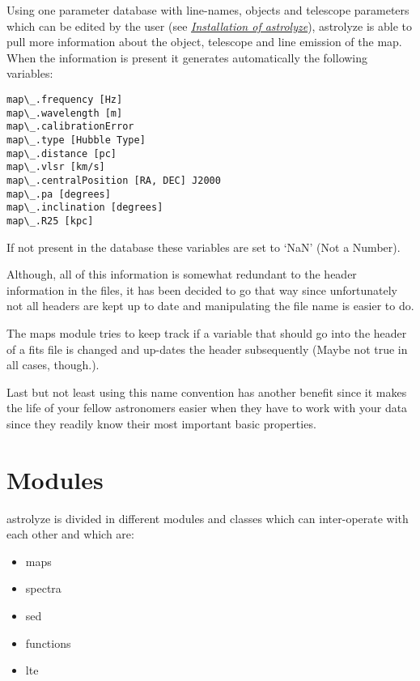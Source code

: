 \documentclass[letterpaper,10pt,english]{sphinxhowto}
\begin{document}
Using one parameter database with line-names, objects and telescope parameters
which can be edited by the user (see {\hyperref[installation::doc]{\emph{Installation of astrolyze}}}), astrolyze is able to
pull more information about the object, telescope and line emission of the
map. When the information is present it generates automatically the following
variables:

\begin{Verbatim}[commandchars=\\\{\}]
map\_.frequency [Hz]
map\_.wavelength [m]
map\_.calibrationError
map\_.type [Hubble Type]
map\_.distance [pc]
map\_.vlsr [km/s]
map\_.centralPosition [RA, DEC] J2000
map\_.pa [degrees]
map\_.inclination [degrees]
map\_.R25 [kpc]
\end{Verbatim}

If not present in the database these variables are set to `NaN' (Not a Number).

Although, all of this information is somewhat redundant to the header
information in the files, it has been decided to go that way since
unfortunately not all headers are kept up to date and manipulating the file
name is easier to do.

The maps module tries to keep track if a variable that should go into the
header of a fits file is changed and up-dates the header subsequently (Maybe
not true in all cases, though.).

Last but not least using this name convention has another benefit since it
makes the life of your fellow astronomers easier when they have to work with
your data since they readily know their most important basic properties.


\section{Modules}
\label{manual:modules}
astrolyze is divided in different modules and classes which can inter-operate
with each other and which are:
\begin{itemize}
\item {} 
maps

\item {} 
spectra

\item {} 
sed

\item {} 
functions

\item {} 
lte

\end{itemize}
\end{document}
